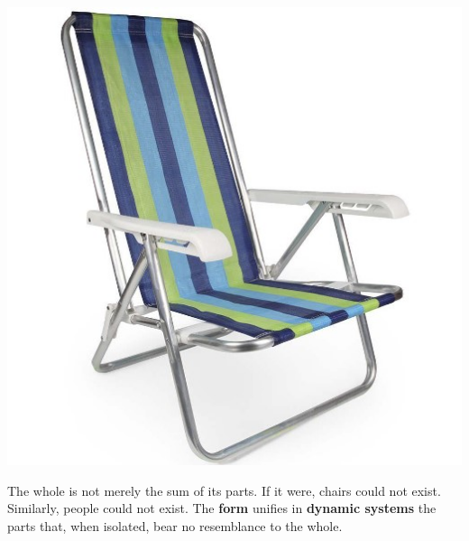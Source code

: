 \documentclass[./main.tex]{subfiles}
\begin{document}
\nolinenumbers

\newpage
\renewcommand{\headrulewidth}{0pt}
\thispagestyle{fancy}
\fancyhf{} %
\fancyfoot{} %
\fancyfoot[C]{\thepage}

\par \hfill
\vspace{40mm}
\begin{adjustwidth}{45pt}{45pt}
\begin{center}
    \includegraphics[scale=1]{figs/fig_chair.jpg}\\
\end{center}
\vspace{10mm}
\noindent \textsf{The whole is not merely the sum of its parts. If it were, chairs could not exist. Similarly, people could not exist. The \textbf{form} unifies in \textbf{dynamic systems} the parts that, when isolated, bear no resemblance to the whole.}

\end{adjustwidth}
\clearpage
\end{document}

